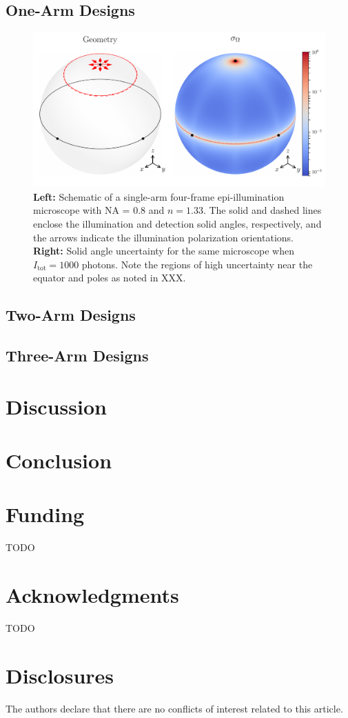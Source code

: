 \documentclass[10pt]{article}
\begin{document}
\subsection{One-Arm Designs}
\begin{figure}[htbp]
\centering\includegraphics[width=\textwidth]{single-arm}
\caption{\textbf{Left:} Schematic of a single-arm four-frame epi-illumination
  microscope with NA = 0.8 and $n = 1.33$. The solid and dashed lines enclose
  the illumination and detection solid angles, respectively, and the arrows
  indicate the illumination polarization orientations. \textbf{Right:} Solid
  angle uncertainty for the same microscope when $I_{\text{tot}} = 1000$
  photons. Note the regions of high uncertainty near the equator and poles
  as noted in XXX.}
\end{figure}

\subsection{Two-Arm Designs}
\subsection{Three-Arm Designs}

\section{Discussion}

\section{Conclusion}

\section*{Funding}
TODO

\section*{Acknowledgments}
TODO

\section*{Disclosures}
The authors declare that there are no conflicts of interest related to this article.
\end{document}
